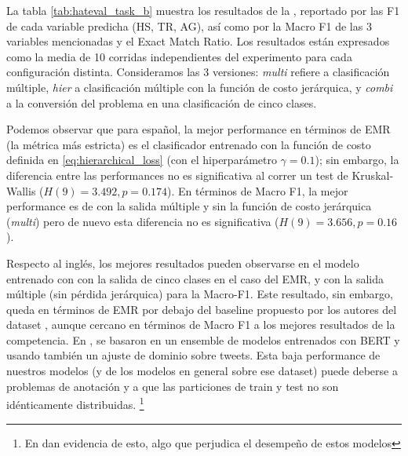 La tabla \ref{tab:hateval_task_b} muestra los resultados de la \subtaskb{}, reportado por las F1 de cada variable predicha (HS, TR, AG), así como por la Macro F1 de las 3 variables mencionadas y el Exact Match Ratio. Los resultados están expresados como la media de 10 corridas independientes del experimento para cada configuración distinta. Consideramos las 3 versiones: \emph{multi} refiere a clasificación múltiple, \emph{hier} a clasificación múltiple con la función de costo jerárquica, y \emph{combi} a la conversión del problema en una clasificación de cinco clases.

Podemos observar que para español, la mejor performance en términos de EMR (la métrica más estricta) es el clasificador entrenado con la función de costo definida en \ref{eq:hierarchical_loss} (con el hiperparámetro $\gamma = 0.1$); sin embargo, la diferencia entre las performances no es significativa al correr un test de Kruskal-Wallis ($H(9) = 3.492, p = 0.174$). En términos de Macro F1, la mejor performance es de \beto{} con la salida múltiple y sin la función de costo jerárquica (\emph{multi}) pero de nuevo esta diferencia no es significativa ($H(9) = 3.656, p=0.16$).

Respecto al inglés, los mejores resultados pueden observarse en el modelo entrenado con \bertweet{} con la salida de cinco clases en el caso del EMR, y con la salida múltiple (sin pérdida jerárquica) para la Macro-F1. Este resultado, sin embargo, queda en términos de EMR por debajo del baseline propuesto por los autores del dataset \cite{hateval2019semeval}, aunque cercano en términos de Macro F1 a los mejores resultados de la competencia. En \citet{gertner-etal-2019-mitre}, se basaron en un ensemble de modelos entrenados con BERT y usando también un ajuste de dominio sobre tweets. Esta baja performance de nuestros modelos (y de los modelos en general sobre ese dataset) puede deberse a problemas de anotación y a que las particiones de train y test no son idénticamente distribuidas. \footnote{En \citet{gertner-etal-2019-mitre} dan evidencia de esto, algo que perjudica el desempeño de estos modelos}



